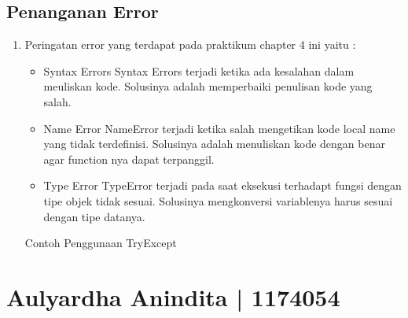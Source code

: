 \subsection{Penanganan Error}
\begin{enumerate}
	\item Peringatan error yang terdapat pada praktikum chapter 4 ini yaitu :

	\begin{itemize}
		\item Syntax Errors
		Syntax Errors terjadi ketika ada kesalahan dalam meuliskan kode. Solusinya adalah memperbaiki penulisan kode yang salah.

		\item Name Error
		NameError terjadi ketika salah mengetikan kode local name yang tidak terdefinisi. Solusinya adalah menuliskan kode dengan benar agar function nya dapat terpanggil. 

		\item Type Error
		TypeError terjadi pada saat eksekusi terhadapt fungsi dengan tipe objek tidak sesuai. Solusinya mengkonversi variablenya harus sesuai dengan tipe datanya.
	\end{itemize}

	Contoh Penggunaan TryExcept
	
\end{enumerate}

\section{Aulyardha Anindita | 1174054}
